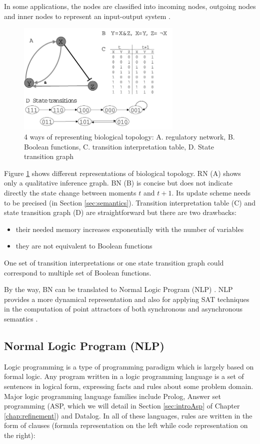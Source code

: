 In some applications, the nodes are classified into incoming nodes, outgoing nodes and inner nodes to represent an input-output system \cite{akutsu2007control}.

\begin{figure}[ht]
    \centering
    \includegraphics[width=0.7\textwidth]{BooleanNetwork.png}
    \caption[Representations of Biological Topology]{4 ways of representing biological topology: A. regulatory network, B. Boolean functions, C. transition interpretation table, D. State transition graph}
    \label{fig:booleannetwork}
\end{figure}

Figure \ref{fig:booleannetwork} shows different representations of biological topology.
RN (A) shows only a qualitative inference graph.
BN (B) is concise but does not indicate directly the state change between moments $t$ and $t+1$.
Its update scheme needs to be precised (in Section \ref{sec:semantics}).
Transition interpretation table (C) and state transition graph (D) are straightforward but there are two drawbacks: 
\begin{itemize}
    \item their needed memory increases exponentially with the number of variables
    \item they are not equivalent to Boolean functions
\end{itemize}
One set of transition interpretations or one state transition graph could correspond to multiple set of Boolean functions.

By the way, BN can be translated to Normal Logic Program (NLP) \cite{inoue2011logic}.
NLP provides a more dynamical representation and also for applying SAT techniques in the computation of point attractors of both synchronous and asynchronous semantics \cite{dubrova2011sat,harvey1997time}.

\subsection{Normal Logic Program (NLP)}
Logic programming is a type of programming paradigm which is largely based on formal logic.
Any program written in a logic programming language is a set of sentences in logical form, expressing facts and rules about some problem domain.
Major logic programming language families include Prolog, Answer set programming (ASP, which we will detail in Section \ref{sec:introAsp} of Chapter \ref{chap:refinement}) and Datalog.
In all of these languages, rules are written in the form of clauses (formula representation on the left while code representation on the right):

